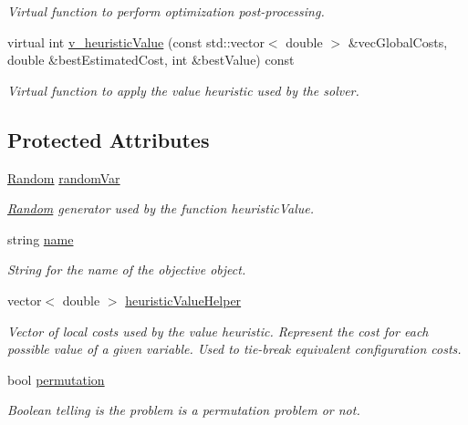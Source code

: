 \begin{DoxyCompactItemize}
\begin{DoxyCompactList}\small\item\em Virtual function to perform optimization post-\/processing. \end{DoxyCompactList}\item 
virtual int \hyperlink{classghost_1_1Objective_a03311ba62213580f1664f164e5f5696a}{v\-\_\-heuristic\-Value} (const std\-::vector$<$ double $>$ \&vec\-Global\-Costs, double \&best\-Estimated\-Cost, int \&best\-Value) const 
\begin{DoxyCompactList}\small\item\em Virtual function to apply the value heuristic used by the solver. \end{DoxyCompactList}\end{DoxyCompactItemize}
\subsection*{Protected Attributes}
\begin{DoxyCompactItemize}
\item 
\hyperlink{classghost_1_1Random}{Random} \hyperlink{classghost_1_1Objective_a442da333edc70f47c33a15987c2a81b8}{random\-Var}
\begin{DoxyCompactList}\small\item\em \hyperlink{classghost_1_1Random}{Random} generator used by the function heuristic\-Value. \end{DoxyCompactList}\item 
string \hyperlink{classghost_1_1Objective_ae9533a52b3600c826df6e20c65db1e7a}{name}
\begin{DoxyCompactList}\small\item\em String for the name of the objective object. \end{DoxyCompactList}\item 
vector$<$ double $>$ \hyperlink{classghost_1_1Objective_a9bfe64f13de15bba7f2fa3a662c02e27}{heuristic\-Value\-Helper}
\begin{DoxyCompactList}\small\item\em Vector of local costs used by the value heuristic. Represent the cost for each possible value of a given variable. Used to tie-\/break equivalent configuration costs. \end{DoxyCompactList}\item 
bool \hyperlink{classghost_1_1Objective_aae8345f4b7981f4b386eb58e447e0286}{permutation}
\begin{DoxyCompactList}\small\item\em Boolean telling is the problem is a permutation problem or not. \end{DoxyCompactList}\end{DoxyCompactItemize}


